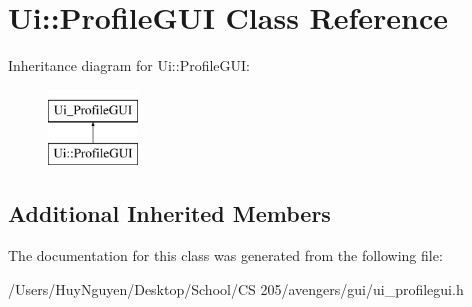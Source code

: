 \hypertarget{classUi_1_1ProfileGUI}{}\section{Ui\+:\+:Profile\+G\+UI Class Reference}
\label{classUi_1_1ProfileGUI}
Inheritance diagram for Ui\+:\+:Profile\+G\+UI\+:\begin{figure}[H]
\begin{center}
\leavevmode
\includegraphics[height=2.000000cm]{classUi_1_1ProfileGUI}
\end{center}
\end{figure}
\subsection*{Additional Inherited Members}


The documentation for this class was generated from the following file\+:\begin{DoxyCompactItemize}
\item 
/\+Users/\+Huy\+Nguyen/\+Desktop/\+School/\+C\+S 205/avengers/gui/ui\+\_\+profilegui.\+h\end{DoxyCompactItemize}
